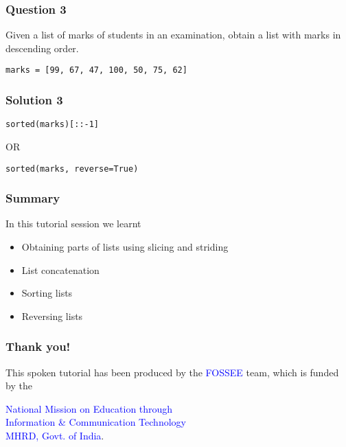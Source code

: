 \documentclass[presentation]{beamer}
\begin{document}
\begin{frame}[fragile]
\frametitle{Question 3}
\label{sec-7}

  Given a list of marks of students in an examination, obtain a list
  with marks in descending order.
\lstset{language=Python}
\begin{lstlisting}
marks = [99, 67, 47, 100, 50, 75, 62]
\end{lstlisting}
\end{frame}
\begin{frame}[fragile]
\frametitle{Solution 3}
\label{sec-8}

\lstset{language=Python}
\begin{lstlisting}
sorted(marks)[::-1]
\end{lstlisting}
OR
\lstset{language=Python}
\begin{lstlisting}
sorted(marks, reverse=True)
\end{lstlisting}
\end{frame}
\begin{frame}
\frametitle{Summary}
\label{sec-9}

  In this tutorial session we learnt
\begin{itemize}
\item Obtaining parts of lists using slicing and striding
\item List concatenation
\item Sorting lists
\item Reversing lists
\end{itemize}
\end{frame}
\begin{frame}
\frametitle{Thank you!}
\label{sec-10}

  \begin{block}{}
  \begin{center}
  This spoken tutorial has been produced by the
  \textcolor{blue}{FOSSEE} team, which is funded by the 
  \end{center}
  \begin{center}
    \textcolor{blue}{National Mission on Education through \\
      Information \& Communication Technology \\ 
      MHRD, Govt. of India}.
  \end{center}  
  \end{block}
\end{frame}
\end{document}
